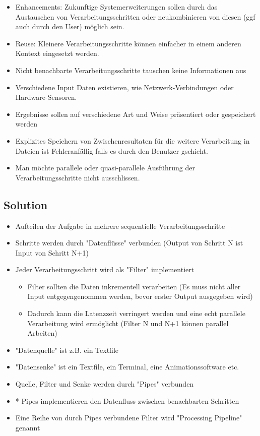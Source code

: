 \begin{itemize}
	\item Enhancements: Zukunftige Systemerweiterungen sollen durch das Austauschen von Verarbeitungsschritten oder neukombinieren von diesen (ggf auch durch den User) möglich sein.
	\item Reuse: Kleinere Verarbeitungsschritte können einfacher in einem anderen Kontext eingesetzt werden.
	\item Nicht benachbarte Verarbeitungsschritte tauschen keine Informationen aus
	\item Verschiedene Input Daten existieren, wie Netzwerk-Verbindungen oder Hardware-Sensoren.
	\item Ergebnisse sollen auf verschiedene Art und Weise präsentiert oder gespeichert werden
	\item Explizites Speichern von Zwischenresultaten für die weitere Verarbeitung in Dateien ist Fehleranfällig falls es durch den Benutzer gschieht.
	\item Man möchte parallele oder quasi-parallele Ausführung der Verarbeitungsschritte nicht ausschlissen.
\end{itemize}

\subsection*{Solution}


\begin{itemize}
	\item Aufteilen der Aufgabe in mehrere sequentielle Verarbeitungsschritte
	\item Schritte werden durch "Datenflüsse" verbunden (Output von Schritt N ist Input von Schritt N+1)
	\item Jeder Verarbeitungsschritt wird als "Filter" implementiert
	\begin{itemize}
		\item Filter sollten die Daten inkrementell verarbeiten (Es muss nicht aller Input entgegengenommen werden, bevor erster Output ausgegeben wird)
		\item Dadurch kann die Latenzzeit verringert werden und eine echt parallele Verarbeitung wird ermöglicht (Filter N und N+1 können parallel Arbeiten)
	\end{itemize}
	\item "Datenquelle" ist z.B. ein Textfile
	\item "Datensenke" ist ein Textfile, ein Terminal, eine Animationssoftware etc.
	\item Quelle, Filter und Senke werden durch "Pipes" verbunden
	\item * Pipes implementieren den Datenfluss zwischen benachbarten Schritten
	\item Eine Reihe von durch Pipes verbundene Filter wird "Processing Pipeline" genannt
\end{itemize}


